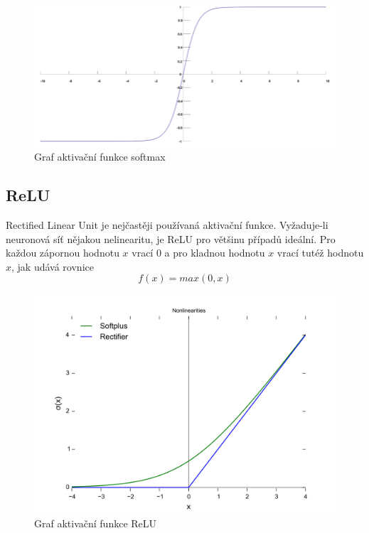 
\begin{figure}[H]
    \centering
    \includegraphics[scale=0.35]{obrazky-figures/softmax.png}
    \caption{\label{fig:softmax}Graf aktivační funkce softmax}
\end{figure}




\subsection*{ReLU}
Rectified Linear Unit je nejčastěji používaná aktivační funkce. Vyžaduje-li neuronová síť nějakou nelinearitu, je ReLU pro většinu případů ideální. Pro každou zápornou hodnotu $x$ vrací $0$ a pro kladnou hodnotu $x$ vrací tutéž hodnotu $x$, jak udává rovnice 
\begin{equation}
   f(x)=max(0,x)
\end{equation}

\begin{figure}[H]
    \centering
    \includegraphics[scale=0.2]{obrazky-figures/ReLU.png}
    \caption{\label{fig:relu}Graf aktivační funkce ReLU}
\end{figure}




